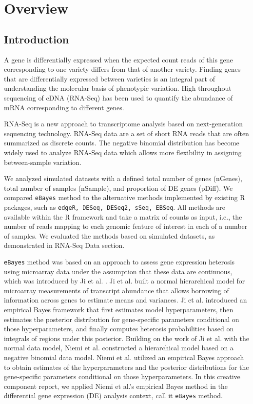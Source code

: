 \chapter{Overview}

\section{Introduction}

A gene is differentially expressed when the expected count reads of this gene corresponding to one variety differs from that of another variety. Finding genes that are differentially expressed between varieties is an integral part of understanding the molecular basis of phenotypic variation. High throughout sequencing of cDNA (RNA-Seq) has been used to quantify the abundance of mRNA corresponding to different genes\citep{soneson2013comparison}.

RNA-Seq is a new approach to transcriptome analysis based on next-generation sequencing technology. RNA-Seq data are a set of short RNA reads that are often summarized as discrete counts. The negative binomial distribution has become widely used to analyze RNA-Seq data which allows more flexibility in assigning between-sample variation\citep{ching2014power}. 

We analyzed simulated datasets with a defined total number of genes (nGenes), total number of samples (nSample), and proportion of DE genes (pDiff). We compared {\tt eBayes}\citep{niemi2015empirical} method to the alternative methods implemented by existing R packages, such as {\tt edgeR, DESeq, DESeq2, sSeq, EBSeq}. All methods are available within the R framework and take a matrix of counts as input, i.e., the number of reads mapping to each genomic feature of interest in each of a number of samples. We evaluated the methods based on simulated datasets, as demonstrated in RNA-Seq Data section. 


{\tt eBayes}\citep{niemi2015empirical} method was based on an approach to assess gene expression heterosis using microarray data under the assumption that these data are continuous, which was introduced by Ji et al. \citep{ji2014estimation}. Ji et al. built a normal hierarchical model for microarray measurements of transcript abundance that allows borrowing of information across genes to estimate means and variances. Ji et al. introduced an empirical Bayes framework that first estimates model hyperparameters, then estimates the posterior distribution for gene-specific parameters conditional on those hyperparameters, and finally computes heterosis probabilities based on integrals of regions under this posterior. Building on the work of Ji et al. with the normal data model, Niemi et al. \citep{niemi2015empirical} constructed a hierarchical model based on a negative binomial data model. Niemi et al. utilized an empirical Bayes approach to obtain estimates of the hyperparameters and the posterior distributions for the gene-specific parameters conditional on those hyperparameters. In this creative component report, we applied Niemi et al.’s empirical Bayes method in the differential gene expression (DE) analysis context, call it {\tt eBayes} method. 

